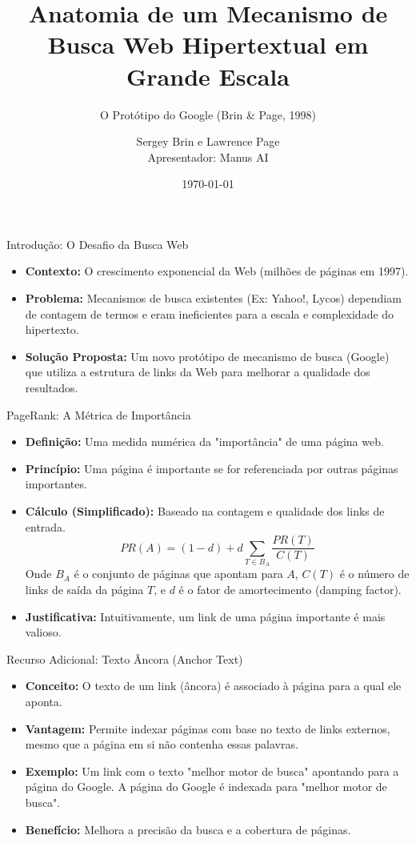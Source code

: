 \documentclass{beamer}
\title[Anatomia do Google]{Anatomia de um Mecanismo de Busca Web Hipertextual em Grande Escala}
\subtitle{O Protótipo do Google (Brin \& Page, 1998)}
\author{Sergey Brin e Lawrence Page \\ \small Apresentador: Manus AI}
\date{\today}
\begin{document}
\begin{frame}
    \titlepage
\end{frame}

\begin{frame}{Introdução: O Desafio da Busca Web}
    \begin{itemize}
        \item \textbf{Contexto:} O crescimento exponencial da Web (milhões de páginas em 1997).
        \item \textbf{Problema:} Mecanismos de busca existentes (Ex: Yahoo!, Lycos) dependiam de contagem de termos e eram ineficientes para a escala e complexidade do hipertexto.
        \item \textbf{Solução Proposta:} Um novo protótipo de mecanismo de busca (Google) que utiliza a estrutura de links da Web para melhorar a qualidade dos resultados.
    \end{itemize}
\end{frame}

\begin{frame}{PageRank: A Métrica de Importância}
    \begin{itemize}
        \item \textbf{Definição:} Uma medida numérica da "importância" de uma página web.
        \item \textbf{Princípio:} Uma página é importante se for referenciada por outras páginas importantes.
        \item \textbf{Cálculo (Simplificado):} Baseado na contagem e qualidade dos links de entrada.
        \begin{equation*}
            PR(A) = (1-d) + d \sum_{T \in B_A} \frac{PR(T)}{C(T)}
        \end{equation*}
        \small Onde $B_A$ é o conjunto de páginas que apontam para $A$, $C(T)$ é o número de links de saída da página $T$, e $d$ é o fator de amortecimento (damping factor).
        \item \textbf{Justificativa:} Intuitivamente, um link de uma página importante é mais valioso.
    \end{itemize}
\end{frame}

\begin{frame}{Recurso Adicional: Texto Âncora (Anchor Text)}
    \begin{itemize}
        \item \textbf{Conceito:} O texto de um link (âncora) é associado à página para a qual ele aponta.
        \item \textbf{Vantagem:} Permite indexar páginas com base no texto de links externos, mesmo que a página em si não contenha essas palavras.
        \item \textbf{Exemplo:} Um link com o texto "melhor motor de busca" apontando para a página do Google. A página do Google é indexada para "melhor motor de busca".
        \item \textbf{Benefício:} Melhora a precisão da busca e a cobertura de páginas.
    \end{itemize}
\end{frame}
\end{document}
